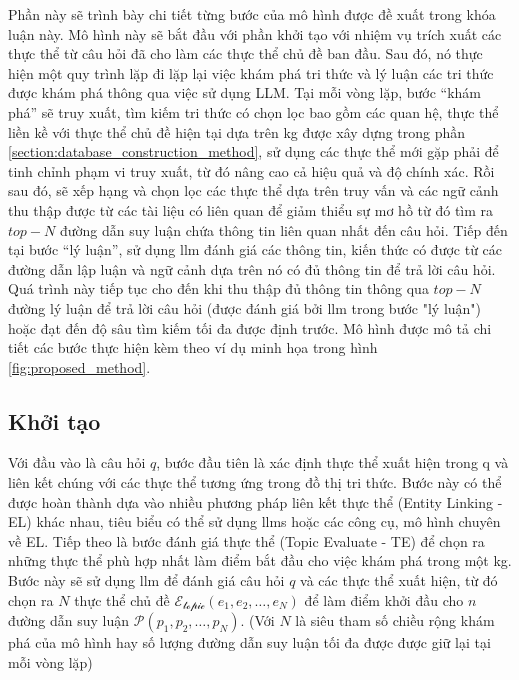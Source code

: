 Phần này sẽ trình bày chi tiết từng bước của mô hình được đề xuất trong khóa luận này. Mô hình này sẽ bắt đầu với phần khởi tạo với nhiệm vụ trích xuất các thực thể từ câu hỏi đã cho làm các thực thể chủ đề ban đầu. Sau đó, nó thực hiện một quy trình lặp đi lặp lại việc khám phá tri thức và lý luận các tri thức được khám phá thông qua việc sử dụng LLM. Tại mỗi vòng lặp, bước “khám phá” sẽ truy xuất, tìm kiếm tri thức có chọn lọc bao gồm các quan hệ, thực thể liền kề với thực thể chủ đề hiện tại dựa trên \gls{kg} được xây dựng trong phần \ref{section:database_construction_method}, sử dụng các thực thể mới gặp phải để tinh chỉnh phạm vi truy xuất, từ đó nâng cao cả hiệu quả và độ chính xác. Rồi sau đó, sẽ xếp hạng và chọn lọc các thực thể dựa trên truy vấn và các ngữ cảnh thu thập được từ các tài liệu có liên quan để giảm thiểu sự mơ hồ từ đó tìm ra $top-N$ đường dẫn suy luận chứa thông tin liên quan nhất đến câu hỏi. Tiếp đến tại bước “lý luận”, sử dụng \gls{llm} đánh giá các thông tin, kiến thức có được từ các đường dẫn lập luận và ngữ cảnh dựa trên nó có đủ thông tin để trả lời câu hỏi. Quá trình này tiếp tục cho đến khi thu thập đủ thông tin thông qua $top-N$ đường lý luận để trả lời câu hỏi (được đánh giá bởi \gls{llm} trong bước "lý luận") hoặc đạt đến độ sâu tìm kiếm tối đa được định trước. Mô hình được mô tả chi tiết các bước thực hiện kèm theo ví dụ minh họa trong hình \ref{fig:proposed_method}.


\subsection{Khởi tạo}
\label{subsection:initialization}
Với đầu vào là câu hỏi $q$, bước đầu tiên là xác định thực thể xuất hiện trong q và liên kết chúng với các thực thể tương ứng trong đồ thị tri thức. Bước này có thể được hoàn thành dựa vào nhiều phương pháp liên kết thực thể (Entity Linking - EL) khác nhau, tiêu biểu có thể sử dụng \gls{llm}s hoặc các công cụ, mô hình chuyên về EL. Tiếp theo là bước đánh giá thực thể (Topic Evaluate - TE) để chọn ra những thực thể phù hợp nhất làm điểm bắt đầu cho việc khám phá trong một \gls{kg}. Bước này sẽ sử dụng \gls{llm} để đánh giá câu hỏi $q$ và các thực thể xuất hiện, từ đó chọn ra $N$ thực thể chủ đề $\mathcal{E_\text{topic}} (e_1, e_2, \dots, e_N)$ để làm điểm khởi đầu cho $n$ đường dẫn suy luận $\mathcal{P}(p_1, p_2, \dots, p_N)$. (Với $N$ là siêu tham số chiều rộng khám phá của mô hình hay số lượng đường dẫn suy luận tối đa được được giữ lại tại mỗi vòng lặp)


